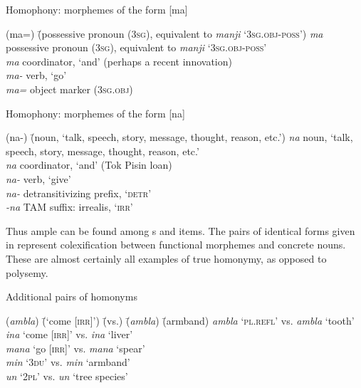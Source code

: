 \ea%
    \label{ex:sem:2f}
           Homophony: morphemes of the form [ma]
\begin{tabbing}
{(ma=)} \= {(possessive pronoun} (3\textsc{sg}), equivalent to \textit{manji} ‘3\textsc{sg.obj-poss’)}\kill
{\textit{ma}} \> {possessive pronoun (3\textsc{sg}), equivalent to \textit{manji} ‘3\textsc{sg.obj-poss’}}\\
{\textit{ma}} \> {coordinator, ‘and’ (perhaps a recent innovation)}\\
{\textit{ma-}} \>  {verb, ‘go’}\\
{\textit{ma=}} \>  {object marker (3\textsc{sg.obj)}}
\end{tabbing}
\z

\ea%
    \label{ex:sem:2g}
           Homophony: morphemes of the form [na]
\begin{tabbing}
{(na-)} \= {(noun, ‘talk, speech, story, message, thought, reason, etc.’)}\kill
{\textit{na}} \> {noun, ‘talk, speech, story, message, thought, reason, etc.’}\\
{\textit{na}} \> {coordinator, ‘and’ (Tok Pisin loan)}\\
{\textit{na-}} \> {verb, ‘give’}\\
{\textit{na-}} \> {detransitivizing prefix, ‘\textsc{detr}’}\\
{\textit{-na}} \> {TAM suffix: irrealis, ‘\textsc{irr}’}
\end{tabbing}
\z

Thus ample  can be found among s and  items. The pairs of identical forms given in  represent colexification between functional morphemes and concrete nouns. These are almost certainly all examples of true homonymy, as opposed to polysemy.

\ea%
    \label{ex:sem:3}
            Additional pairs of homonyms
\begin{tabbing}
{(\textit{ambla})} \= {(‘come [\textsc{irr]}’)} \= {(vs.)} \= {(\textit{ambla})} \= {(armband)}\kill
{\textit{ambla}} \> {‘\textsc{pl.refl’}} \> {vs.} \> {\textit{ambla}} \> {‘tooth’}\\
{\textit{ina}} \> {‘come [\textsc{irr]}’} \> {vs.} \> {\textit{ina}} \> {‘liver’}\\
{\textit{mana}} \> {‘go [\textsc{irr]’}} \> {vs.} \> {\textit{mana}} \> {‘spear’}\\
{\textit{min}} \> {‘3\textsc{du’}} \> {vs.} \> {\textit{min}} \> {‘armband’}\\
{\textit{un}} \> {‘\textsc{2pl’}} \> {vs.} \> {\textit{un}} \> {‘tree species’}
\end{tabbing}
\z

